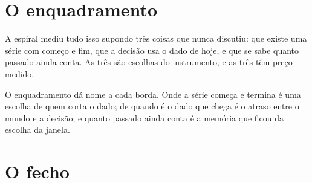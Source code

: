 \documentclass[12pt]{book}
\theoremstyle{definition}
\theoremstyle{remark}
\begin{document}












\part{O enquadramento}

A espiral mediu tudo isso supondo três coisas que nunca discutiu: que existe uma série com
começo e fim, que a decisão usa o dado de hoje, e que se sabe quanto passado ainda conta. As
três são escolhas do instrumento, e as três têm preço medido.

O enquadramento dá nome a cada borda. Onde a série começa e termina é uma escolha de quem corta
o dado; de quando é o dado que chega é o atraso entre o mundo e a decisão; e quanto passado
ainda conta é a memória que ficou da escolha da janela.















\part{O fecho}
\end{document}
